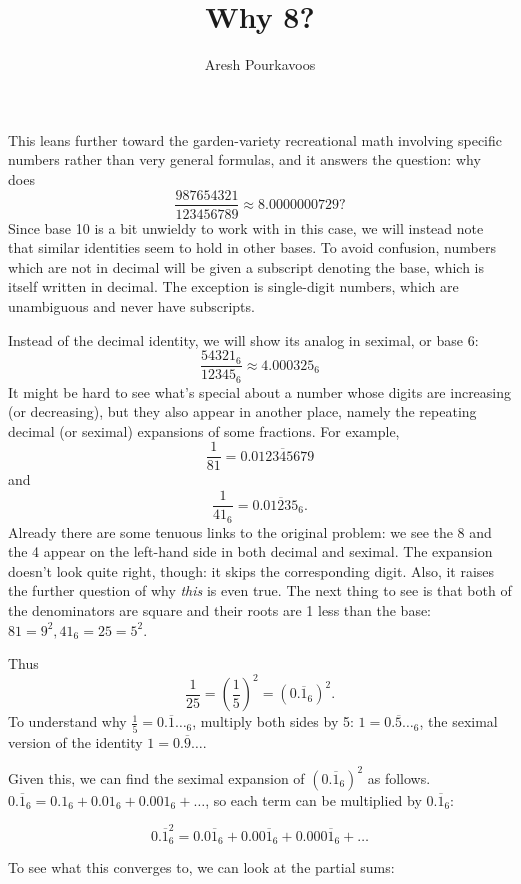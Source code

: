 \documentclass{article}
\begin{document}
\title{Why 8?}
\author{Aresh Pourkavoos}
\maketitle

This leans further toward the garden-variety recreational math
involving specific numbers rather than very general formulas,
and it answers the question: why does
\[\frac{987654321}{123456789} \approx 8.0000000729?\]
Since base 10 is a bit unwieldy to work with in this case,
we will instead note that similar identities seem to hold in other bases.
To avoid confusion, numbers which are not in decimal
will be given a subscript denoting the base,
which is itself written in decimal.
The exception is single-digit numbers, which are unambiguous
and never have subscripts.

Instead of the decimal identity,
we will show its analog in seximal, or base 6:
\[\frac{54321_6}{12345_6} \approx 4.000325_6\]
It might be hard to see what's special
about a number whose digits are increasing (or decreasing),
but they also appear in another place,
namely the repeating decimal (or seximal) expansions of some fractions.
For example,
\[\frac{1}{81} = 0.\overline{012345679}\]
and
\[\frac{1}{41_6} = 0.\overline{01235}_6.\]
Already there are some tenuous links to the original problem:
we see the 8 and the 4 appear on the left-hand side
in both decimal and seximal.
The expansion doesn't look quite right, though:
it skips the corresponding digit.
Also, it raises the further question
of why \textit{this} is even true.
The next thing to see is that both of the denominators are square
and their roots are 1 less than the base:
$81=9^2, 41_6=25=5^2$.

Thus
\[\frac{1}{25}=\left(\frac{1}{5}\right)^2=(0.\overline{1}_6)^2.\]
To understand why $\frac{1}{5}=0.\overline{1}\ldots_6$,
multiply both sides by 5:
$1=0.\overline{5}\ldots_6$,
the seximal version of the identity $1=0.\overline{9}\ldots$.

Given this, we can find the seximal expansion of $(0.\overline{1}_6)^2$
as follows.
$0.\overline{1}_6=0.1_6+0.01_6+0.001_6+\ldots$,
so each term can be multiplied by $0.\overline{1}_6$:

\[0.\overline{1}_6^2 = 0.0\overline{1}_6+0.00\overline{1}_6+0.000\overline{1}_6+\ldots\]

To see what this converges to, we can look at the partial sums:
\end{document}
